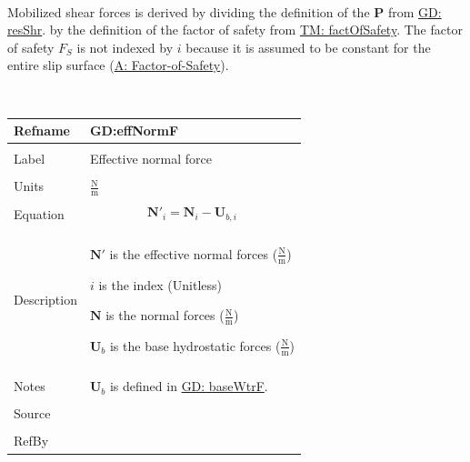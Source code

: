\documentclass[12pt]{article}
\begin{document}
\paragraph{}
\label{GD:mobShrDeriv}
Mobilized shear forces is derived by dividing the definition of the $\mathbf{P}$ from \hyperref[GD:resShr]{GD: resShr}. by the definition of the factor of safety from \hyperref[TM:factOfSafety]{TM: factOfSafety}. The factor of safety ${F_{S}}$ is not indexed by $i$ because it is assumed to be constant for the entire slip surface (\hyperref[assumpFOS]{A: Factor-of-Safety}).
\par~

\noindent \begin{minipage}{\textwidth}
          \begin{tabular}{>{\raggedright}p{}>{\raggedright\arraybackslash}p{}}
          \toprule \textbf{Refname} & \textbf{GD:effNormF}
          \label{GD:effNormF}
          \\ \midrule \\
          Label & Effective normal force
          \\ \midrule \\
          Units & $\frac{\text{N}}{\text{m}}$
          \\ \midrule \\
          Equation & \begin{displaymath}
                     {\mathbf{N'}}_{i}={\mathbf{N}}_{i}-{\mathbf{U}_{b,i}}
                     \end{displaymath}
          \\ \midrule \\
          Description & \begin{symbDescription}
                        \item{$\mathbf{N'}$ is the effective normal forces ($\frac{\text{N}}{\text{m}}$)}
                        \item{$i$ is the index (Unitless)}
                        \item{$\mathbf{N}$ is the normal forces ($\frac{\text{N}}{\text{m}}$)}
                        \item{${\mathbf{U}_{b}}$ is the base hydrostatic forces ($\frac{\text{N}}{\text{m}}$)}
                        \end{symbDescription}
          \\ \midrule \\
          Notes & ${\mathbf{U}_{b}}$ is defined in \hyperref[GD:baseWtrF]{GD: baseWtrF}.
          \\ \midrule \\
          Source & \cite{chen2005}
          \\ \midrule \\
          RefBy & 
          \\ \bottomrule
          \end{tabular}
          \end{minipage}
\end{document}
